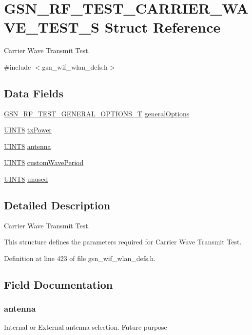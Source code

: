 \hypertarget{a00185}{
\section{GSN\_\-RF\_\-TEST\_\-CARRIER\_\-WAVE\_\-TEST\_\-S Struct Reference}
\label{a00185}
}


Carrier Wave Transmit Test.  




{\ttfamily \#include $<$gsn\_\-wif\_\-wlan\_\-defs.h$>$}

\subsection*{Data Fields}
\begin{DoxyCompactItemize}
\item 
\hyperlink{a00188}{GSN\_\-RF\_\-TEST\_\-GENERAL\_\-OPTIONS\_\-T} \hyperlink{a00185_a5e4e9e8d2b76fbb6bdf201c4aeddd60d}{generalOptions}
\item 
\hyperlink{a00660_gab27e9918b538ce9d8ca692479b375b6a}{UINT8} \hyperlink{a00185_a763a8a049f451428e05835d3c3b466cd}{txPower}
\item 
\hyperlink{a00660_gab27e9918b538ce9d8ca692479b375b6a}{UINT8} \hyperlink{a00185_ad84150bc4d20a5e841d834b269db9901}{antenna}
\item 
\hyperlink{a00660_gab27e9918b538ce9d8ca692479b375b6a}{UINT8} \hyperlink{a00185_ac31de4bff9a4d75b56974c870ee58fd5}{customWavePeriod}
\item 
\hyperlink{a00660_gab27e9918b538ce9d8ca692479b375b6a}{UINT8} \hyperlink{a00185_a04efd61f68d1dcc6739211e703576ea7}{unused}
\end{DoxyCompactItemize}


\subsection{Detailed Description}
Carrier Wave Transmit Test. 

This structure defines the parameters required for Carrier Wave Transmit Test. 

Definition at line 423 of file gsn\_\-wif\_\-wlan\_\-defs.h.



\subsection{Field Documentation}
\hypertarget{a00185_ad84150bc4d20a5e841d834b269db9901}{
\subsubsection[{antenna}]{ {\bf antenna}}}
\label{a00185_ad84150bc4d20a5e841d834b269db9901}
Internal or External antenna selection. Future purpose 

